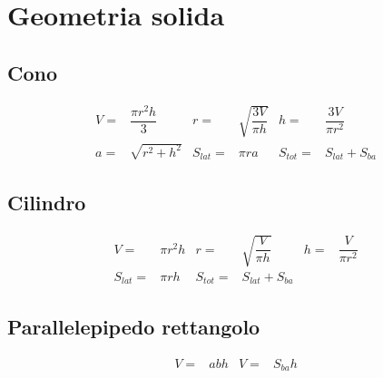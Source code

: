 \chapter{Geometria solida}
\section{Cono}
\begin{tcolorbox}[sidebyside,righthand width=9cm,colback=white,colframe=white,fonttitle=\bfseries	]
	
	\tcblower
	\begin{align*}
V=&\dfrac{\pi r^2h}{3}&r=&\sqrt{\dfrac{3V}{\pi h}}&h=&\dfrac{3V}{\pi r^2}\\
a=&\sqrt{r^2+h^2}&S_{lat}=&\pi r a&S_{tot}=&S_{lat}+S_{ba}
	\end{align*}
\end{tcolorbox}
\section{Cilindro}
\begin{tcolorbox}[sidebyside,righthand width=9cm,colback=white,colframe=white,fonttitle=\bfseries	]
	
	\tcblower
	\begin{align*}
	V=&\pi r^2h&r=&\sqrt{\dfrac{V}{\pi h}}&h=&\dfrac{V}{\pi r^2}\\
	S_{lat}=&\pi r h&S_{tot}=&S_{lat}+S_{ba}
	\end{align*}
\end{tcolorbox}
\section{Parallelepipedo rettangolo}
\begin{tcolorbox}[sidebyside,righthand width=9cm,colback=white,colframe=white,fonttitle=\bfseries	]
	
	\tcblower
	\begin{align*}
	V=&abh&V=&S_{ba}h
	\end{align*}
\end{tcolorbox}